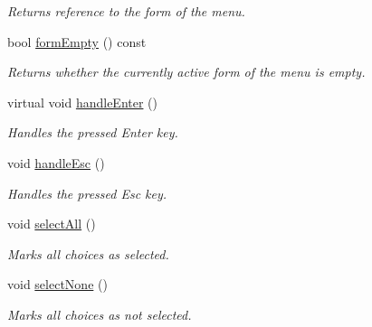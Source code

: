 \begin{DoxyCompactItemize}
\begin{DoxyCompactList}\small\item\em Returns reference to the form of the menu. \end{DoxyCompactList}\item 
bool \hyperlink{structMenuBase_adb78f340ce1a333352e33f949511befe}{form\+Empty} () const 
\begin{DoxyCompactList}\small\item\em Returns whether the currently active form of the menu is empty. \end{DoxyCompactList}\item 
virtual void \hyperlink{structMenuBase_a7372f4ebdf4d12303786e2c7180f6cf2}{handle\+Enter} ()\hypertarget{structMenuBase_a7372f4ebdf4d12303786e2c7180f6cf2}{}\label{structMenuBase_a7372f4ebdf4d12303786e2c7180f6cf2}

\begin{DoxyCompactList}\small\item\em Handles the pressed Enter key. \end{DoxyCompactList}\item 
void \hyperlink{structMenuBase_a0e0d3420d7ea0808b07fbd859edc4810}{handle\+Esc} ()\hypertarget{structMenuBase_a0e0d3420d7ea0808b07fbd859edc4810}{}\label{structMenuBase_a0e0d3420d7ea0808b07fbd859edc4810}

\begin{DoxyCompactList}\small\item\em Handles the pressed Esc key. \end{DoxyCompactList}\item 
void \hyperlink{structMenuBase_a9132ada30d68890c22d699c95aee1b8e}{select\+All} ()\hypertarget{structMenuBase_a9132ada30d68890c22d699c95aee1b8e}{}\label{structMenuBase_a9132ada30d68890c22d699c95aee1b8e}

\begin{DoxyCompactList}\small\item\em Marks all choices as selected. \end{DoxyCompactList}\item 
void \hyperlink{structMenuBase_a6e17c5fa23ffc882fe19e45caa18858c}{select\+None} ()\hypertarget{structMenuBase_a6e17c5fa23ffc882fe19e45caa18858c}{}\label{structMenuBase_a6e17c5fa23ffc882fe19e45caa18858c}

\begin{DoxyCompactList}\small\item\em Marks all choices as not selected. \end{DoxyCompactList}\end{DoxyCompactItemize}
